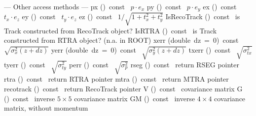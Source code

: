 \documentclass{article}
\begin{document}
\begin{cxxentry}
\begin{cxxclass}
\begin{cxxpublic}
        {--- Other access methods --- }
        {}
        {}
        {}
\label{cxx.1.1.53}
        {px}
        {()\ const\ }
        { $p \cdot e_x$}
        {}
\label{cxx.1.1.54}
        {py}
        {()\ const\ }
        { $p \cdot e_y$}
        {}
\label{cxx.1.1.55}
        {ex}
        {()\ const\ }
        { $t_x \cdot e_z$}
        {}
\label{cxx.1.1.56}
        {ey}
        {()\ const\ }
        { $t_y \cdot e_z$}
        {}
\label{cxx.1.1.57}
        {ez}
        {()\ const\ }
        { $1/\sqrt{1+t_x^2+t_y^2}$}
        {}
\label{cxx.1.1.58}
        {IsRecoTrack}
        {()\ const\ }
        { is Track constructed from RecoTrack object?}
        {}
\label{cxx.1.1.59}
        {IsRTRA}
        {()\ const\ }
        { is Track constructed from RTRA object? (n.a. in ROOT)}
        {}
\label{cxx.1.1.60}
        {xerr}
        {(double\ dz\ =\ 0)\ const\ }
        { $\sqrt{\sigma_x^2(z+dz)}$}
        {}
\label{cxx.1.1.61}
        {yerr}
        {(double\ dz\ =\ 0)\ const\ }
        { $\sqrt{\sigma_y^2(z+dz)}$}
        {}
\label{cxx.1.1.62}
        {txerr}
        {()\ const\ }
        { $\sqrt{\sigma^2_{tx}}$}
        {}
\label{cxx.1.1.63}
        {tyerr}
        {()\ const\ }
        { $\sqrt{\sigma^2_{ty}}$}
        {}
\label{cxx.1.1.64}
        {perr}
        {()\ const\ }
        { $\sqrt{\sigma^2_p}$}
        {}
\label{cxx.1.1.65}
        {rseg}
        {()\ const\ }
        { return RSEG pointer}
        {}
\label{cxx.1.1.66}
        {rtra}
        {()\ const\ }
        { return RTRA pointer}
        {}
\label{cxx.1.1.67}
        {mtra}
        {()\ const\ }
        { return MTRA pointer}
        {}
\label{cxx.1.1.68}
        {recotrack}
        {()\ const\ }
        { return RecoTrack pointer}
        {}
\label{cxx.1.1.69}
        {V}
        {()\ const\ }
        { covariance matrix}
        {}
\label{cxx.1.1.70}
        {G}
        {()\ const\ }
        { inverse $5\times5$ covariance matrix}
        {}
\label{cxx.1.1.71}
        {GM}
        {()\ const\ }
        { inverse $4\times4$ covariance matrix, without momentum}
        {}
\label{cxx.1.1.72}
\cxxitem{}

\end{cxxpublic}
\end{cxxclass}
\end{cxxentry}
\end{document}
